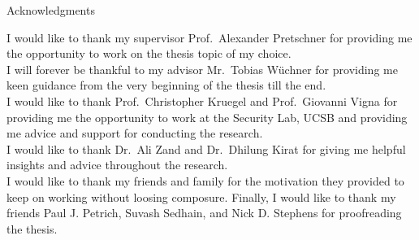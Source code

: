 \thispagestyle{empty}

\vspace*{2cm}

\begin{center}
{ Acknowledgments}
\end{center}

\vspace{1cm}

I would like to thank my supervisor Prof.\ Alexander Pretschner for providing me the opportunity to work on the thesis topic of my choice.\\
I will forever be thankful to my advisor Mr.\ Tobias Wüchner for providing me keen guidance from the very beginning of the thesis till the end.\\

I would like to thank Prof.\ Christopher Kruegel and Prof.\ Giovanni Vigna for providing me the opportunity to work at the Security Lab, UCSB and providing me advice and support for conducting the research.\\
I would like to thank Dr.\ Ali Zand and Dr.\ Dhilung Kirat for giving me helpful insights and advice throughout the research.\\

I would like to thank my friends and family for the motivation they provided to keep on working without loosing composure.
Finally, I would like to thank my friends Paul J. Petrich, Suvash Sedhain, and Nick D. Stephens for proofreading the thesis.

\cleardoublepage{}
